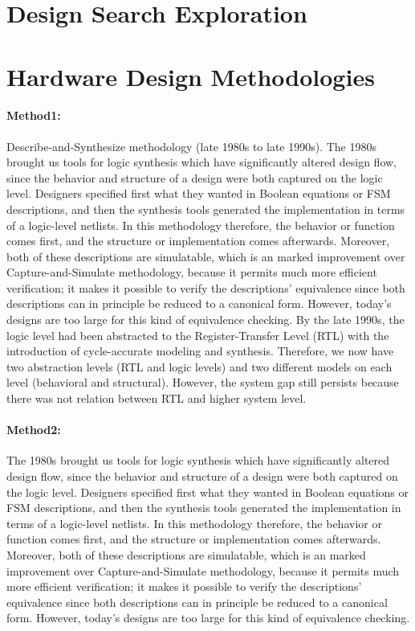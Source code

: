 \section{Design Search Exploration}

\section{Hardware Design Methodologies}

\paragraph{Method1:} Describe-and-Synthesize methodology (late 1980s to late 1990s).
The 1980s brought us tools for logic synthesis which have significantly altered design flow, since the behavior and structure of a design were both captured on the logic level.
Designers specified first what they wanted in Boolean equations or FSM descriptions, and then the synthesis tools generated the implementation in terms of a logic-level netlists.
In this methodology therefore, the behavior or function comes first, and the structure or implementation comes afterwards.
Moreover, both of these descriptions are simulatable, which is an marked improvement over Capture-and-Simulate methodology, because it permits much more efficient verification; it makes it possible to verify the descriptions’ equivalence since both descriptions can in principle be reduced to a canonical form.
However, today’s designs are too large for this kind of equivalence checking.
By the late 1990s, the logic level had been abstracted to the Register-Transfer Level (RTL) with the introduction of cycle-accurate modeling and synthesis.
Therefore, we now have two abstraction levels (RTL and logic levels) and two different models on each level (behavioral and structural).
However, the system gap still persists because there was not relation between RTL and higher system level.

\paragraph{Method2:}  The 1980s brought us tools for logic synthesis which have significantly altered design flow, since the behavior and structure of a design were both captured on the logic level.
Designers specified first what they wanted in Boolean equations or FSM descriptions, and then the synthesis tools generated the implementation in terms of a logic-level netlists.
In this methodology therefore, the behavior or function comes first, and the structure or implementation comes afterwards.
Moreover, both of these descriptions are simulatable, which is an marked improvement over Capture-and-Simulate methodology, because it permits much more efficient verification; it makes it possible to verify the descriptions’ equivalence since both descriptions can in principle be reduced to a canonical form.
However, today’s designs are too large for this kind of equivalence checking.

